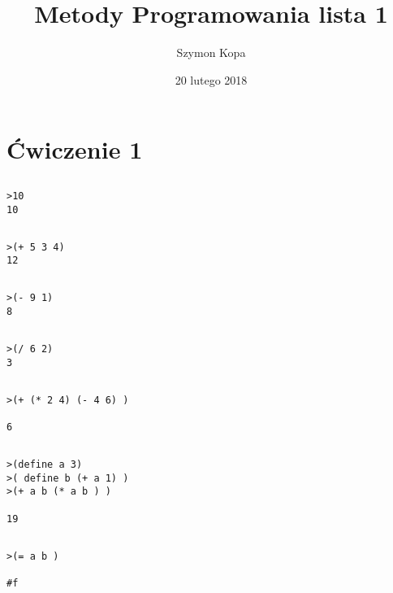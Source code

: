 \documentclass[a4paper]{article}
\title{Metody Programowania lista 1}
\author{Szymon Kopa}
\date{20 lutego 2018}
\begin{document}
\maketitle
\clearpage

\section{Ćwiczenie 1}
\subsection{}
\begin{lstlisting}
>10
10
\end{lstlisting}
\subsection{}
\begin{lstlisting}
>(+ 5 3 4)
12
\end{lstlisting}
\subsection{}
\begin{lstlisting}
>(- 9 1)
8
\end{lstlisting}
\subsection{}
\begin{lstlisting}
>(/ 6 2)
3
\end{lstlisting}
\subsection{}
\begin{lstlisting}
>(+ (* 2 4) (- 4 6) )

6
\end{lstlisting}
\subsection{}
\begin{lstlisting}
>(define a 3)
>( define b (+ a 1) )
>(+ a b (* a b ) )

19
\end{lstlisting}
\subsection{}
\begin{lstlisting}
>(= a b )

#f
\end{lstlisting}
\end{document}
